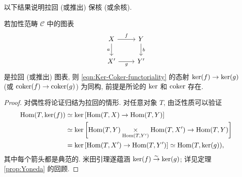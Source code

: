 以下结果说明拉回 (或推出) 保核 (或余核).
\begin{proposition}\label{prop:pull-back-ker}
	若加性范畴 $\mathcal{C}$ 中的图表
	\[\begin{tikzcd}
		X \arrow[r, "f"] \arrow[d, "a"'] & Y \arrow[d, "b"] \\
		X' \arrow[r, "g"'] & Y'
	\end{tikzcd}\]
	是拉回 (或推出) 图表, 则 \eqref{eqn:Ker-Coker-functoriality} 的态射 $\operatorname{ker}(f) \to \operatorname{ker}(g)$ (或 $\operatorname{coker}(f) \to \operatorname{coker}(g)$) 为同构, 前提是所论的 $\operatorname{ker}$ 和 $\operatorname{coker}$ 存在.
\end{proposition}
\begin{proof}
	对偶性将论证归结为拉回的情形. 对任意对象 $T$, 由泛性质可以验证
	\begin{align*}
		\operatorname{Hom}(T, \operatorname{ker}(f)) & \simeq \operatorname{ker}\left[ \operatorname{Hom}(T, X) \to \operatorname{Hom}(T, Y) \right] \\
		& \simeq \operatorname{ker}\left[ \operatorname{Hom}(T, Y) \underset{\operatorname{Hom}(T, Y')}{\times} \operatorname{Hom}(T, X') \to \operatorname{Hom}(T, Y) \right] \\
		& = \operatorname{ker}\left[ \operatorname{Hom}(T, X') \to \operatorname{Hom}(T, Y') \right] \simeq \operatorname{Hom}(T, \operatorname{ker}(g)),
	\end{align*}
	其中每个箭头都是典范的. 米田引理遂蕴涵 $\operatorname{ker}(f) \stackrel{\sim}{\rightarrow} \operatorname{ker}(g)$; 详见定理 \ref{prop:Yoneda} 的回顾.
\end{proof}

